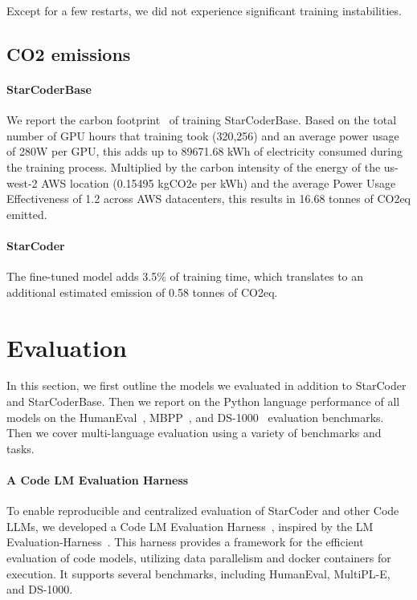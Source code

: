 \documentclass[10pt]{article} %
\begin{document}
Except for a few restarts, we did not experience significant training instabilities. 

\subsection{CO2 emissions}\label{sec:co2emission}
\paragraph{StarCoderBase} We report the carbon footprint~\citep{lacoste2019quantifying} of training StarCoderBase. Based on the total number of GPU hours that training took (320,256) and an average power usage of 280W per GPU, this adds up to 89671.68 kWh of electricity consumed during the training process. Multiplied by the carbon intensity of the energy of the us-west-2 AWS location (0.15495 kgCO2e per kWh) and the average Power Usage Effectiveness of 1.2 across AWS datacenters,  this results in 16.68 tonnes of CO2eq emitted. 

\paragraph{StarCoder} The fine-tuned model adds 3.5\% of training time, which translates to an additional estimated emission of 0.58 tonnes of CO2eq.  \

\section{Evaluation}\label{sec:evaluation}

In this section, we first outline the models we evaluated in addition to StarCoder and StarCoderBase. Then we report on the Python language performance of all models on the HumanEval~\citep{chen2021codex}, MBPP~\citep{austin2021program}, and DS-1000~\citep{Lai2022DS1000} evaluation benchmarks. Then we cover multi-language evaluation using a variety of benchmarks and tasks.

\paragraph{A Code LM Evaluation Harness}

To enable reproducible and centralized evaluation of StarCoder and other Code LLMs, we developed a Code LM Evaluation Harness~\citep{bigcode-evaluation-harness}, inspired by the LM Evaluation-Harness~\citep{eval-harness}. This harness provides a framework for the efficient evaluation of code models, utilizing data parallelism and docker containers for execution. It supports several benchmarks, including HumanEval, MultiPL-E, and DS-1000.
\end{document}
